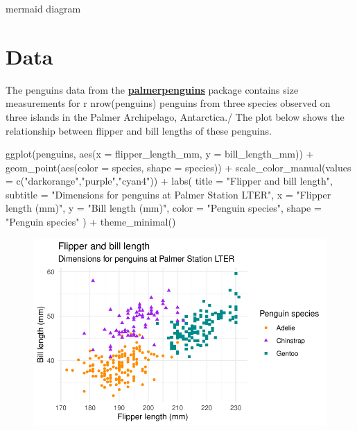 \documentclass[
  12pt,
  a4paper,
]{scrbook}
\newenvironment{Shaded}{\begin{snugshade}}{\end{snugshade}}
\newcommand{\AttributeTok}[1]{\textcolor[rgb]{0.15,0.55,0.82}{#1}}
\newcommand{\FunctionTok}[1]{\textcolor[rgb]{0.15,0.55,0.82}{#1}}
\newcommand{\NormalTok}[1]{\textcolor[rgb]{0.40,0.48,0.51}{#1}}
\newcommand{\SpecialCharTok}[1]{\textcolor[rgb]{0.86,0.20,0.18}{#1}}
\newcommand{\StringTok}[1]{\textcolor[rgb]{0.16,0.63,0.60}{#1}}
\begin{document}
mermaid diagram

\hypertarget{data}{%
\section{Data}\label{data}}

The penguins data from the
\href{https://allisonhorst.github.io/palmerpenguins}{\textbf{palmerpenguins}}
package contains size measurements for r nrow(penguins) penguins from
three species observed on three islands in the Palmer Archipelago,
Antarctica./ The plot below shows the relationship between flipper and
bill lengths of these penguins.

\begin{Shaded}
\begin{Highlighting}[numbers=left,,]
\FunctionTok{ggplot}\NormalTok{(penguins, }
       \FunctionTok{aes}\NormalTok{(}\AttributeTok{x =}\NormalTok{ flipper\_length\_mm, }\AttributeTok{y =}\NormalTok{ bill\_length\_mm)) }\SpecialCharTok{+}
  \FunctionTok{geom\_point}\NormalTok{(}\FunctionTok{aes}\NormalTok{(}\AttributeTok{color =}\NormalTok{ species, }\AttributeTok{shape =}\NormalTok{ species)) }\SpecialCharTok{+}
  \FunctionTok{scale\_color\_manual}\NormalTok{(}\AttributeTok{values =} \FunctionTok{c}\NormalTok{(}\StringTok{"darkorange"}\NormalTok{,}\StringTok{"purple"}\NormalTok{,}\StringTok{"cyan4"}\NormalTok{)) }\SpecialCharTok{+}
  \FunctionTok{labs}\NormalTok{(}
    \AttributeTok{title =} \StringTok{"Flipper and bill length"}\NormalTok{,}
    \AttributeTok{subtitle =} \StringTok{"Dimensions for penguins at Palmer Station LTER"}\NormalTok{,}
    \AttributeTok{x =} \StringTok{"Flipper length (mm)"}\NormalTok{, }\AttributeTok{y =} \StringTok{"Bill length (mm)"}\NormalTok{,}
    \AttributeTok{color =} \StringTok{"Penguin species"}\NormalTok{, }\AttributeTok{shape =} \StringTok{"Penguin species"}
\NormalTok{  ) }\SpecialCharTok{+}
  \FunctionTok{theme\_minimal}\NormalTok{()}
\end{Highlighting}
\end{Shaded}

\begin{figure}[H]

{\centering \includegraphics{./03_resultats_files/figure-pdf/plot-penguins-1.pdf}

}

\end{figure}
\end{document}
